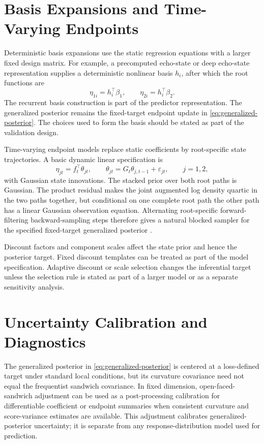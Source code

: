 \documentclass[11pt]{article}
\numberwithin{equation}{section}
\begin{document}
\section{Basis Expansions and Time-Varying Endpoints}
\label{sec:extensions}

Deterministic basis expansions use the static regression equations with a
larger fixed design matrix. For example, a precomputed echo-state or deep
echo-state representation supplies a deterministic nonlinear basis
\(h_i\), after which the root functions are
\[
\eta_{1i}=h_i^\top\beta_1,\qquad
\eta_{2i}=h_i^\top\beta_2.
\]
The recurrent basis construction is part of the predictor representation. The
generalized posterior remains the fixed-target endpoint update in
\eqref{eq:generalized-posterior}. The choices used to form the basis should be
stated as part of the validation design.

Time-varying endpoint models replace static coefficients by root-specific state
trajectories. A basic dynamic linear specification is
\[
\eta_{jt}=f_t^\top\theta_{jt},\qquad
\theta_{jt}=G_t\theta_{j,t-1}+\varepsilon_{jt},\qquad j=1,2,
\]
with Gaussian state innovations. The stacked prior over both root paths is
Gaussian. The product residual makes the joint augmented log density quartic in
the two paths together, but conditional on one complete root path the other path
has a linear Gaussian observation equation. Alternating root-specific
forward-filtering backward-sampling steps therefore gives a natural blocked
sampler for the specified fixed-target generalized posterior
\citep{GoncalvesMigonBastos2020DQLM}.

Discount factors and component scales affect the state prior and hence the
posterior target. Fixed discount templates can be treated as part of the model
specification. Adaptive discount or scale selection changes the inferential
target unless the selection rule is stated as part of a larger model or as a
separate sensitivity analysis.

\section{Uncertainty Calibration and Diagnostics}
\label{sec:diagnostics}

The generalized posterior in \eqref{eq:generalized-posterior} is centered at a
loss-defined target under standard local conditions, but its curvature
covariance need not equal the frequentist sandwich covariance. In fixed
dimension, open-faced-sandwich adjustment \citep{Shaby2014OpenFacedSandwich}
can be used as a post-processing calibration for differentiable coefficient or
endpoint summaries when consistent curvature and score-variance estimates are
available. This adjustment calibrates generalized-posterior uncertainty; it is
separate from any response-distribution model used for prediction.
\end{document}
